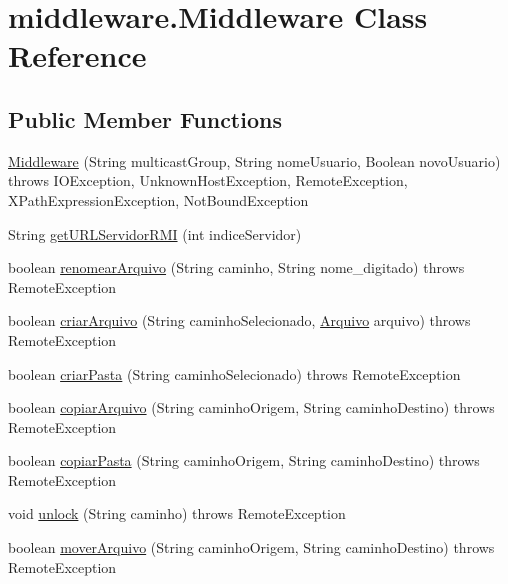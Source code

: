 \hypertarget{classmiddleware_1_1_middleware}{\section{middleware.\+Middleware Class Reference}
\label{classmiddleware_1_1_middleware}
}
\subsection*{Public Member Functions}
\begin{DoxyCompactItemize}
\item 
\hyperlink{classmiddleware_1_1_middleware_a2d7a099e82706c91ad5d5355c1959359}{Middleware} (String multicast\+Group, String nome\+Usuario, Boolean novo\+Usuario)  throws I\+O\+Exception, Unknown\+Host\+Exception, Remote\+Exception, X\+Path\+Expression\+Exception, Not\+Bound\+Exception 
\item 
String \hyperlink{classmiddleware_1_1_middleware_a3e838354f2f062385660c1c04681185e}{get\+U\+R\+L\+Servidor\+R\+M\+I} (int indice\+Servidor)
\item 
boolean \hyperlink{classmiddleware_1_1_middleware_a5f164a846ad486428469c7cdb79d985a}{renomear\+Arquivo} (String caminho, String nome\+\_\+digitado)  throws Remote\+Exception 
\item 
boolean \hyperlink{classmiddleware_1_1_middleware_a1ccaadf844107f004660ee209286dcd0}{criar\+Arquivo} (String caminho\+Selecionado, \hyperlink{classmodel_1_1_arquivo}{Arquivo} arquivo)  throws Remote\+Exception 
\item 
boolean \hyperlink{classmiddleware_1_1_middleware_a457ec4259716b0360c0ea38b5d30f86f}{criar\+Pasta} (String caminho\+Selecionado)  throws Remote\+Exception 
\item 
boolean \hyperlink{classmiddleware_1_1_middleware_a5656da24daf0e3e1ab472708a9ad3833}{copiar\+Arquivo} (String caminho\+Origem, String caminho\+Destino)  throws Remote\+Exception 
\item 
boolean \hyperlink{classmiddleware_1_1_middleware_ae299002971f601e9b4fcb7427c808f37}{copiar\+Pasta} (String caminho\+Origem, String caminho\+Destino)  throws Remote\+Exception 
\item 
void \hyperlink{classmiddleware_1_1_middleware_afac57d6d69b6fb3abf14bd8ec6d62737}{unlock} (String caminho)  throws Remote\+Exception 
\item 
boolean \hyperlink{classmiddleware_1_1_middleware_ae89884186ded30327bd4b02b781531b3}{mover\+Arquivo} (String caminho\+Origem, String caminho\+Destino)  throws Remote\+Exception 

\end{DoxyCompactItemize}
